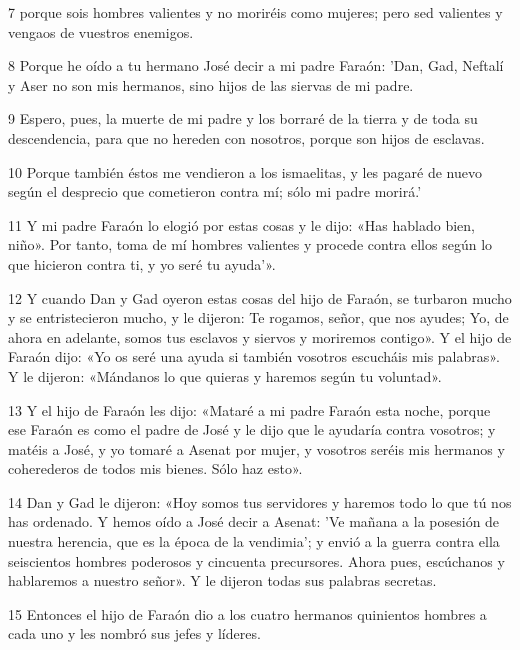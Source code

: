 \par 7 porque sois hombres valientes y no moriréis como mujeres; pero sed valientes y vengaos de vuestros enemigos.

\par 8 Porque he oído a tu hermano José decir a mi padre Faraón: 'Dan, Gad, Neftalí y Aser no son mis hermanos, sino hijos de las siervas de mi padre.

\par 9 Espero, pues, la muerte de mi padre y los borraré de la tierra y de toda su descendencia, para que no hereden con nosotros, porque son hijos de esclavas.

\par 10 Porque también éstos me vendieron a los ismaelitas, y les pagaré de nuevo según el desprecio que cometieron contra mí; sólo mi padre morirá.'

\par 11 Y mi padre Faraón lo elogió por estas cosas y le dijo: «Has hablado bien, niño». Por tanto, toma de mí hombres valientes y procede contra ellos según lo que hicieron contra ti, y yo seré tu ayuda'».

\par 12 Y cuando Dan y Gad oyeron estas cosas del hijo de Faraón, se turbaron mucho y se entristecieron mucho, y le dijeron: Te rogamos, señor, que nos ayudes; Yo, de ahora en adelante, somos tus esclavos y siervos y moriremos contigo». Y el hijo de Faraón dijo: «Yo os seré una ayuda si también vosotros escucháis mis palabras». Y le dijeron: «Mándanos lo que quieras y haremos según tu voluntad».

\par 13 Y el hijo de Faraón les dijo: «Mataré a mi padre Faraón esta noche, porque ese Faraón es como el padre de José y le dijo que le ayudaría contra vosotros; y matéis a José, y yo tomaré a Asenat por mujer, y vosotros seréis mis hermanos y coherederos de todos mis bienes. Sólo haz esto».

\par 14 Dan y Gad le dijeron: «Hoy somos tus servidores y haremos todo lo que tú nos has ordenado. Y hemos oído a José decir a Asenat: 'Ve mañana a la posesión de nuestra herencia, que es la época de la vendimia'; y envió a la guerra contra ella seiscientos hombres poderosos y cincuenta precursores. Ahora pues, escúchanos y hablaremos a nuestro señor». Y le dijeron todas sus palabras secretas.

\par 15 Entonces el hijo de Faraón dio a los cuatro hermanos quinientos hombres a cada uno y les nombró sus jefes y líderes.

